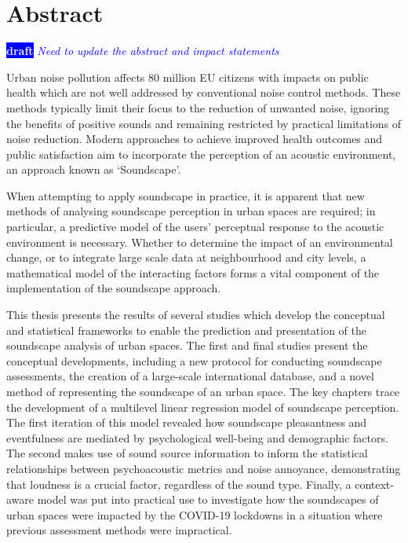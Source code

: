 \documentclass[twoside,fontsize=12pt,titlepage,chapterprefix=true
]{scrbook}
\newcommand{\remark}[3]{%
    {\colorbox{#2}{\sffamily\scriptsize\bfseries\textcolor{white}{#1}}}
    {\sffamily\small\itshape\textcolor{#2}{#3}}
}
\newcommand{\draft}[1]{\remark{draft}{blue}{#1}}
\begin{document}
\chapter*{Abstract}
\draft{Need to update the abstract and impact statements}
Urban noise pollution affects 80 million EU citizens with impacts on public health which are not well addressed by conventional noise control methods. These methods typically limit their focus to the reduction of unwanted noise, ignoring the benefits of positive sounds and remaining restricted by practical limitations of noise reduction. Modern approaches to achieve improved health outcomes and public satisfaction aim to incorporate the perception of an acoustic environment, an approach known as ‘Soundscape’.

When attempting to apply soundscape in practice, it is apparent that new methods of analysing soundscape perception in urban spaces are required; in particular, a predictive model of the users’ perceptual response to the acoustic environment is necessary. Whether to determine the impact of an environmental change, or to integrate large scale data at neighbourhood and city levels, a mathematical model of the interacting factors forms a vital component of the implementation of the soundscape approach.

This thesis presents the results of several studies which develop the conceptual and statistical frameworks to enable the prediction and presentation of the soundscape analysis of urban spaces. The first and final studies present the conceptual developments, including a new protocol for conducting soundscape assessments, the creation of a large-scale international database, and a novel method of representing the soundscape of an urban space. The key chapters trace the development of a multilevel linear regression model of soundscape perception. The first iteration of this model revealed how soundscape pleasantness and eventfulness are mediated by psychological well-being and demographic factors. The second makes use of sound source information to inform the statistical relationships between psychoacoustic metrics and noise annoyance, demonstrating that loudness is a crucial factor, regardless of the sound type. Finally, a context-aware model was put into practical use to investigate how the soundscapes of urban spaces were impacted by the COVID-19 lockdowns in a situation where previous assessment methods were impractical.
\end{document}
